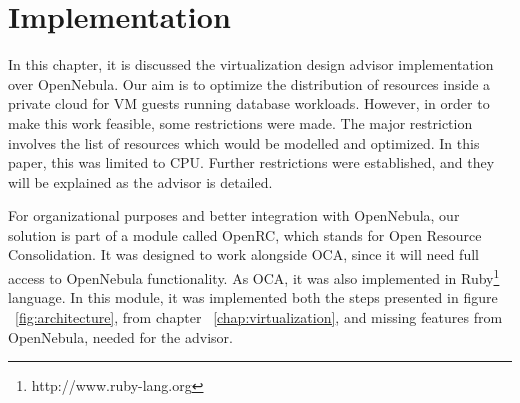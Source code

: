 \chapter{\textbf{Implementation}}

\label{chap:implementation}

In this chapter, it is discussed the virtualization design advisor implementation over OpenNebula. Our aim is to optimize the distribution of resources inside a private cloud for VM guests running database workloads. However, in order to make this work feasible, some restrictions were made. The major restriction involves the list of resources which would be modelled and optimized. In this paper, this was limited to CPU. Further restrictions were established, and they will be explained as the advisor is detailed.

For organizational purposes and better integration with OpenNebula, our solution  is part of a module called OpenRC, which stands for Open Resource Consolidation. It was designed to work alongside OCA, since it will need full access to OpenNebula functionality. As OCA, it was also implemented in Ruby\footnote{http://www.ruby-lang.org} language. In this module, it was implemented both the steps presented in figure ~\ref{fig:architecture}, from chapter ~\ref{chap:virtualization}, and missing features from OpenNebula, needed for the advisor.

